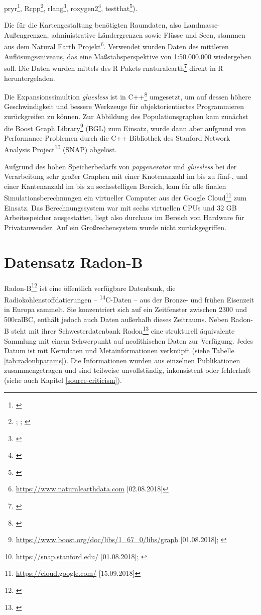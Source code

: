 \documentclass[openany,twoside,twocolumn]{book}
\let\rmarkdownfootnote\footnote%
\def\footnote{\protect\rmarkdownfootnote}
\begin{document}
pryr\footnote{\textcite{wickham_pryr_2018}}, Rcpp\footnote{\textcite{eddelbuettel_extending_2017}; \textcite{eddelbuettel_rcpp_2011}; \textcite{eddelbuettel_seamless_2013}}, rlang\footnote{\textcite{henry_rlang_2018}}, roxygen2\footnote{\textcite{wickham_roxygen2_2017}}, testthat\footnote{\textcite{wickham_testthat_2011}}).

Die für die Kartengestaltung benötigten Raumdaten, also Landmasse-Außengrenzen, administrative Ländergrenzen sowie Flüsse und Seen, stammen aus dem Natural Earth Projekt\footnote{\url{https://www.naturalearthdata.com} {[}02.08.2018{]}}. Verwendet wurden Daten des mittleren Auflösungssniveaus, das eine Maßstabsperspektive von 1:50.000.000 wiedergeben soll. Die Daten wurden mittels des R Pakets rnaturalearth\footnote{\textcite{south_rnaturalearth_2017}} direkt in R heruntergeladen.

Die Expansionssimultion \emph{gluesless} ist in C++\footnote{\textcite{standard-cpp-foundation_international_2017}} umgesetzt, um auf dessen höhere Geschwindigkeit und bessere Werkzeuge für objektorientiertes Programmieren zurückgreifen zu können. Zur Abbildung des Populationsgraphen kam zunächst die Boost Graph Library\footnote{\url{https://www.boost.org/doc/libs/1_67_0/libs/graph} {[}01.08.2018{]}; \textcite{siek_boost_2002}} (BGL) zum Einsatz, wurde dann aber aufgrund von Performance-Problemen durch die C++ Bibliothek des Stanford Network Analysis Project\footnote{\url{https://snap.stanford.edu/} {[}01.08.2018{]}; \textcite{leskovec2016snap}} (SNAP) abgelöst.

Aufgrund des hohen Speicherbedarfs von \emph{popgenerator} und \emph{gluesless} bei der Verarbeitung sehr großer Graphen mit einer Knotenanzahl im bis zu fünf-, und einer Kantenanzahl im bis zu sechsstelligen Bereich, kam für alle finalen Simulationsberechnungen ein virtueller Computer aus der Google Cloud\footnote{\url{https://cloud.google.com/} {[}15.09.2018{]}} zum Einsatz. Das Berechnungssystem war mit sechs virtuellen CPUs und 32 GB Arbeitsspeicher ausgestattet, liegt also durchaus im Bereich von Hardware für Privatanwender. Auf ein Großrechensystem wurde nicht zurückgegriffen.

\hypertarget{radonb-dataset}{%
\section{Datensatz Radon-B}\label{radonb-dataset}}

Radon-B\footnote{\textcite{kneisel_radon-b_2013}} ist eine öffentlich verfügbare Datenbank, die Radiokohlenstoffdatierungen -- \textsuperscript{14}C-Daten -- aus der Bronze- und frühen Eisenzeit in Europa sammelt. Sie konzentriert sich auf ein Zeitfenster zwischen 2300 und 500calBC, enthält jedoch auch Daten außerhalb dieses Zeitraums. Neben Radon-B steht mit ihrer Schwesterdatenbank Radon\footnote{\textcite{martin_hinz_radon_2012}} eine strukturell äquivalente Sammlung mit einem Schwerpunkt auf neolithischen Daten zur Verfügung. Jedes Datum ist mit Kerndaten und Metainformationen verknüpft (siehe Tabelle \ref{tab:radonbparams}). Die Informationen wurden aus einzelnen Publikationen zusammengetragen und sind teilweise unvollständig, inkonsistent oder fehlerhaft (siehe auch Kapitel \ref{source-criticism}).
\end{document}

